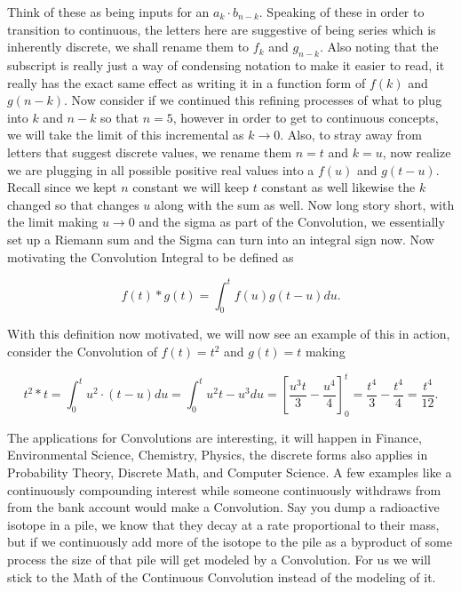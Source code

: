 \documentclass[12pt]{article}
\begin{document}
Think of these as being inputs for an $a_k \cdot b_{n-k}$. Speaking of these in order to transition to continuous, the letters here are suggestive of being series which is inherently discrete, we shall rename them to $f_k$ and $g_{n-k}$. Also noting that the subscript is really just a way of condensing notation to make it easier to read, it really has the exact same effect as writing it in a function form of $f(k)$ and $g(n-k)$. Now consider if we continued this refining processes of what to plug into $k$ and $n-k$ so that $n=5$, however in order to get to continuous concepts, we will take the limit of this incremental as $k\rightarrow0$. Also, to stray away from letters that suggest discrete values, we rename them $n=t$ and $k=u$, now realize we are plugging in all possible positive real values into a $f(u)$ and $g(t-u)$. Recall since we kept $n$ constant we will keep $t$ constant as well likewise the $k$ changed so that changes $u$ along with the sum as well. Now long story short, with the limit making $u\rightarrow0$ and the sigma as part of the Convolution, we essentially set up a Riemann sum and the Sigma can turn into an integral sign now. Now motivating the Convolution Integral to be defined as

\begin{equation*}
    f(t) \ast g(t) = \int_{0}^{t} f(u)g(t-u) du.
\end{equation*}

With this definition now motivated, we will now see an example of this in action, consider the Convolution of $f(t)=t^2$ and $g(t)=t$ making

\begin{equation*}
    t^2 \ast t = \int_{0}^{t} u^2\cdot(t-u) du = \int_{0}^{t} u^2t-u^3 du = \left[\frac{u^3t}{3}-\frac{u^4}{4} \right]_{0}^{t} = \frac{t^4}{3}-\frac{t^4}{4}=\frac{t^4}{12}.
\end{equation*}

The applications for Convolutions are interesting, it will happen in Finance, Environmental Science, Chemistry, Physics, the discrete forms also applies in Probability Theory, Discrete Math, and Computer Science. A few examples like a continuously compounding interest while someone continuously withdraws from from the bank account would make a Convolution. Say you dump a radioactive isotope in a pile, we know that they decay at a rate proportional to their mass, but if we continuously add more of the isotope to the pile as a byproduct of some process the size of that pile will get modeled by a Convolution. For us we will stick to the Math of the Continuous Convolution instead of the modeling of it.
\end{document}
